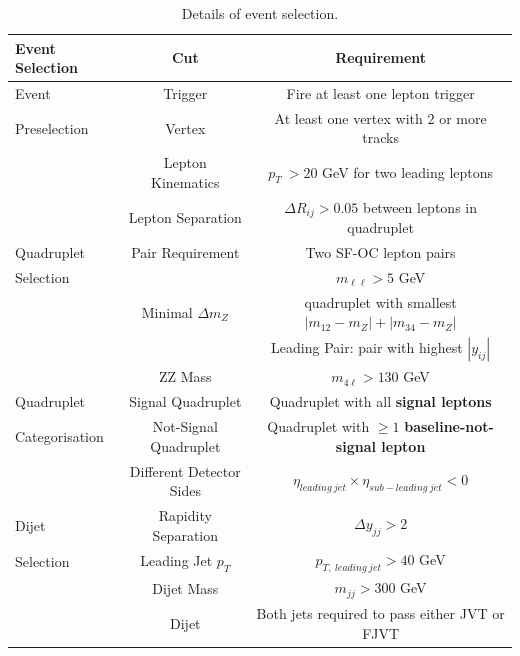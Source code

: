 \begin{table}[!htb]
    \centering
        \caption{Details of event selection.\label{tab:EventSelection}}
        \begin{tabular}{|| l || c | c ||}
        \hline
        Event Selection         & Cut                   & Requirement                                                       \\
        \hline\hline
        Event               & Trigger                   &  Fire at least one lepton trigger                                     \\
        Preselection                & Vertex                    & At least one vertex with $2$ or more tracks                               \\
        \hline  
                    & Lepton Kinematics         & $p_{T}~ > 20$ GeV for two leading leptons                     \\
                    & Lepton Separation         & $\Delta R_{ij} > 0.05$ between leptons in quadruplet      \\
        Quadruplet  & Pair Requirement          & Two SF-OC lepton pairs                                            \\
        Selection   &                       & $m_{\ell\ell} > 5$ GeV                                    \\
                    & Minimal $\Delta m_{Z}$    & quadruplet with smallest $|m_{12} - m_{Z} | + |m_{34} - m_{Z} |$\\
                    &                       & Leading Pair: pair with highest $|y_{ij}|$                        \\
                    & ZZ Mass               & $m_{4\ell} > 130 $ GeV                                            \\
        \hline  
        Quadruplet          & Signal Quadruplet         & Quadruplet with all \textbf{signal leptons}                           \\
        Categorisation          & Not-Signal Quadruplet         & Quadruplet with $\geq 1$ \textbf{baseline-not-signal lepton}          \\
        \hline  
                    & Different Detector Sides      & $\eta_{leading~jet} \times \eta_{sub-leading~jet} < 0 $          \\
        Dijet       & Rapidity Separation       & $ \Delta y_{jj}> 2 $                                              \\
        Selection   & Leading Jet $p_{T}$   &   $p_{T,~leading~jet} > 40$ GeV               \\
                    & Dijet Mass                & $m_{jj} > 300 $ GeV                                                   \\
                    & Dijet         & Both jets required to pass either JVT or FJVT                             \\
        \hline  
                            

\end{tabular}
\end{table}
